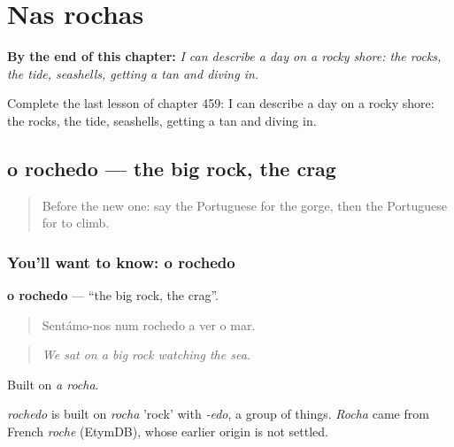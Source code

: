 
\chapter{Nas rochas}
\label{ch:pt-nas-rochas}

\begin{chapteropening}
\textbf{By the end of this chapter:} \emph{I can describe a day on a rocky shore: the rocks, the tide, seashells, getting a tan and diving in.}

Complete the last lesson of chapter 459: I can describe a day on a rocky shore: the rocks, the tide, seashells, getting a tan and diving in.
\end{chapteropening}

\section[o rochedo]{o rochedo — the big rock, the crag}

\label{lesson:PT-C459-rochedo}



\begin{quote}
Before the new one: say the Portuguese for the gorge, then the Portuguese for to climb.
\end{quote}

\subsection*{You'll want to know: o rochedo}
\textbf{o rochedo} — \textquotedblleft{}the big rock, the crag\textquotedblright{}.

\begin{quote}
Sentámo-nos num rochedo a ver o mar.
\end{quote}

\begin{quote}
\emph{We sat on a big rock watching the sea.}
\end{quote}

Built on \emph{a rocha}.

\begin{cousinweb}
\emph{rochedo} is built on \emph{rocha} 'rock' with \emph{-edo}, a group of things. \emph{Rocha} came from French \emph{roche} (EtymDB), whose earlier origin is not settled.
\end{cousinweb}

